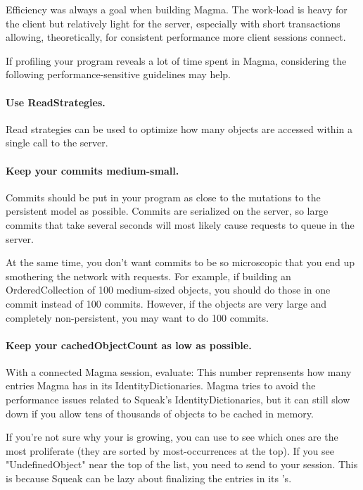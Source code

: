 \documentclass[a4paper,10pt,twoside]{book}
\begin{document}
Efficiency was always a goal when building Magma. The work-load is heavy for the client but relatively light for the server, especially with short transactions allowing, theoretically, for consistent performance more client sessions connect.

If profiling your program reveals a lot of time spent in Magma, considering the following performance-sensitive guidelines may help.


\paragraph{Use ReadStrategies.} Read strategies can be used to optimize how many objects are accessed within a single call to the server.

\paragraph{Keep your commits medium-small.} Commits should be put in your program as close to the mutations to the persistent model as possible. Commits are serialized on the server, so large commits that take several seconds will most likely cause requests to queue in the server.

At the same time, you don't want commits to be so microscopic that you end up smothering the network with requests. For example, if building an OrderedCollection of 100 medium-sized objects, you should do those in one commit instead of 100 commits. However, if the objects are very large and completely non-persistent, you may want to do 100 commits.

\paragraph{Keep your cachedObjectCount as low as possible.}

With a connected Magma session, evaluate: 
This number reprensents how many entries Magma has in its IdentityDictionaries. Magma tries to avoid the performance issues related to Squeak's IdentityDictionaries, but it can still slow down if you allow tens of thousands of objects to be cached in memory.

If you're not sure why your  is growing, you can use  to see which ones are the most proliferate (they are sorted by most-occurrences at the top). If you see "UndefinedObject" near the top of the list, you need to send  to your session. This is because Squeak can be lazy about finalizing the entries in its 's.
\end{document}
